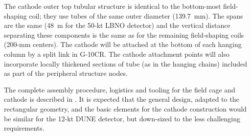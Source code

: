 The cathode outer top tubular structure is identical to the bottom-most
field-shaping coil; they use tubes of the same outer diameter
(139.7~mm).  The spans are the same (48~m for the 50-kt LBNO detector)
and the vertical distance separating these components is the same as
for the remaining field-shaping coils (200-mm centers). The cathode
will be attached at the bottom of each hanging column by a split link
in G-10CR. The cathode attachment points will also incorporate locally
thickened sections of tube (as in the hanging chains) included as part
of the peripheral structure nodes.
 
The complete assembly procedure, logistics and tooling for the field
cage and cathode is described in \anxlbnob.  It is expected that the
general design, adapted to the rectangular geometry, and the basic
elements for the cathode construction would be similar for the 12-kt
DUNE detector, but down-sized to the less challenging requirements.
